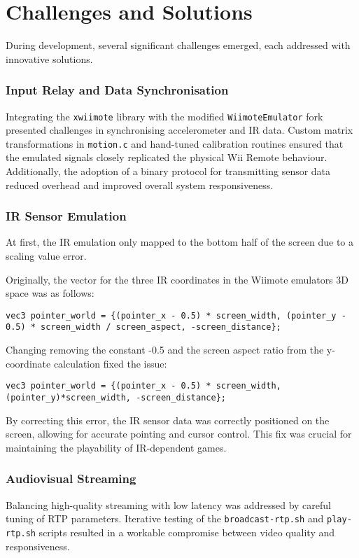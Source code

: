 \section{Challenges and Solutions}

During development, several significant challenges emerged, each addressed with innovative solutions.

\subsubsection{Input Relay and Data Synchronisation}
Integrating the \texttt{xwiimote} library with the modified \texttt{WiimoteEmulator} fork presented challenges in synchronising accelerometer and IR data. Custom matrix transformations in \texttt{motion.c} and hand-tuned calibration routines ensured that the emulated signals closely replicated the physical Wii Remote behaviour. Additionally, the adoption of a binary protocol for transmitting sensor data reduced overhead and improved overall system responsiveness.

\subsubsection{IR Sensor Emulation}
At first, the IR emulation only mapped to the bottom half of the screen due to a scaling value error.

Originally, the vector for the three IR coordinates in the Wiimote emulators 3D space was as follows:
\begin{lstlisting}[style=CStyle, emph={vec3}, emphstyle={\color{magenta}}]
vec3 pointer_world = {(pointer_x - 0.5) * screen_width, (pointer_y - 0.5) * screen_width / screen_aspect, -screen_distance};
\end{lstlisting}

Changing removing the constant -0.5 and the screen aspect ratio from the y-coordinate calculation fixed the issue:
\begin{lstlisting}[style=CStyle, emph={vec3}, emphstyle={\color{magenta}}]
vec3 pointer_world = {(pointer_x - 0.5) * screen_width, (pointer_y)*screen_width, -screen_distance};
\end{lstlisting}

By correcting this error, the IR sensor data was correctly positioned on the screen, allowing for accurate pointing and cursor control. This fix was crucial for maintaining the playability of IR-dependent games.

\subsubsection{Audiovisual Streaming}
Balancing high-quality streaming with low latency was addressed by careful tuning of RTP parameters. Iterative testing of the \texttt{broadcast-rtp.sh} and \texttt{play-rtp.sh} scripts resulted in a workable compromise between video quality and responsiveness.

